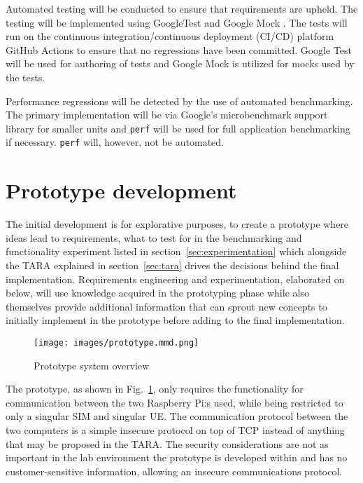 Automated testing will be conducted to ensure that requirements are
upheld. The testing will be implemented using GoogleTest \cite{googletest}
and Google Mock \cite{googletest}. The tests will run on the
continuous integration/continuous deployment (CI/CD) platform
GitHub Actions \cite{github-actions} to ensure that no regressions
have been committed. Google Test will be used for authoring of
tests and Google Mock is utilized for mocks used by the tests.

Performance regressions will be detected by the use of automated
benchmarking. The primary implementation will be via Google's
microbenchmark support library \cite{google-benchmark} for smaller
units and \verb|perf| \cite{perf} will be used for full application
benchmarking if necessary. \verb|perf| will, however, not be
automated.

\section{Prototype development}
\label{sec:prototype-development}

The initial development is for explorative purposes, to create a
prototype \cite[62]{sommerville-software-engineering} \cite[56]{thomas-hunt-pragmatic-programmer}
where ideas lead to requirements, what to test for in the
benchmarking and functionality experiment listed in section~\ref{sec:experimentation}
which alongside the TARA explained in section~\ref{sec:tara} drives
the decisions behind the final implementation. Requirements
engineering and experimentation, elaborated on below, will use
knowledge acquired in the prototyping phase while also themselves
provide additional information that can sprout new concepts to
initially implement in the prototype before adding to the final
implementation.

\begin{figure}[ht]
	\centering
	\texttt{[image: images/prototype.mmd.png]}
	\caption{Prototype system overview}
	\label{fig:prototype-diagram}
\end{figure}

The prototype, as shown in Fig.~\ref{fig:prototype-diagram}, only
requires the functionality for communication between the two
Raspberry Pi:s used, while being restricted to only a singular SIM
and singular UE. The communication protocol between the two
computers is a simple insecure protocol on top of TCP instead of
anything that may be proposed in the TARA. The security
considerations are not as important in the lab environment the
prototype is developed within and has no customer-sensitive
information, allowing an insecure communications protocol.

